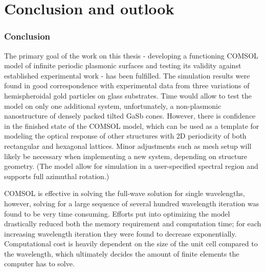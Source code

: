 
\chapter{Conclusion and outlook}

\subsection*{Conclusion}
The primary goal of the work on this thesis - developing a functioning COMSOL model of infinite periodic plasmonic surfaces and testing its validity against established experimental work - has been fulfilled. The simulation results were found in good correspondence with experimental data from three variations of hemispheroidal gold particles on glass substrates. Time would allow to test the model on only one additional system, unfortunately, a non-plasmonic nanostructure of densely packed tilted GaSb cones. However, there is confidence in the finished state of the COMSOL model, which can be used as a template for modeling the optical response of other structures with 2D periodicity of both rectangular and hexagonal lattices. Minor adjustments such as mesh setup will likely be necessary when implementing a new system, depending on structure geometry. (The model allow for simulation in a user-specified spectral region and supports full azimuthal rotation.)


COMSOL is effective in solving the full-wave solution for single wavelengths, however, solving for a large sequence of several hundred wavelength iteration was found to be very time consuming. Efforts put into optimizing the model drastically reduced both the memory requirement and computation time; for each increasing wavelength iteration they were found to decrease exponentially. Computational cost is heavily dependent on the size of the unit cell compared to the wavelength, which ultimately decides the amount of finite elements the computer has to solve. %

